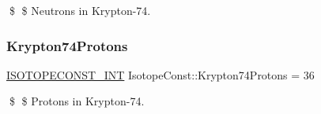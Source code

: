 \$ \$ Neutrons in Krypton-\/74. \mbox{\label{group___isotope_const-_krypton-_kr74_gaf546cb7d65f9a356b0ee37cf83ecc402}} 
\subsubsection{\texorpdfstring{Krypton74\+Protons}{Krypton74Protons}}
{\footnotesize\ttfamily \mbox{\hyperlink{group___isotope_const-_macros_ga5f18360b3e99483a35c32d789e62621c}{I\+S\+O\+T\+O\+P\+E\+C\+O\+N\+S\+T\+\_\+\+I\+NT}} Isotope\+Const\+::\+Krypton74\+Protons = 36}

\$ \$ Protons in Krypton-\/74. 